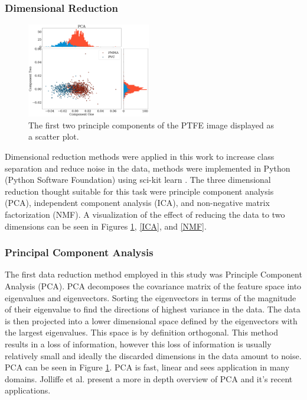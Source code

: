 \documentclass[a4paper,11pt]{article}
\begin{document}
\subsubsection{Dimensional Reduction}

\begin{figure}
  
  \begin{center}
    \includegraphics[width=0.48\textwidth]{figures/PCAnone.png}
  \end{center}
  
  \caption{The first two principle components of the PTFE image displayed as a scatter plot.}
  \label{PCA}
  
\end{figure}

Dimensional reduction methods were applied in this work to increase class separation and reduce noise in the data, methods were implemented in Python (Python Software Foundation) using sci-kit learn \cite{Pedregosa2011Scikit-learn:Python}. The three dimensional reduction thought suitable for this task were principle component analysis (PCA), independent component analysis (ICA), and non-negative matrix factorization (NMF). A visualization of the effect of reducing the data to two dimensions can be seen in Figures \ref{PCA}, \ref{ICA}, and \ref{NMF}.

\subsubsection{Principal Component Analysis}

The first data reduction method employed in this study was Principle Component Analysis (PCA). PCA decomposes the covariance matrix of the feature space into eigenvalues and eigenvectors. Sorting the eigenvectors in terms of the magnitude of their eigenvalue to find the directions of highest variance in the data. The data is then projected into a lower dimensional space defined by the eigenvectors with the largest eigenvalues. This space is by definition orthogonal. This method results in a loss of information, however this loss of information is usually relatively small and ideally the discarded dimensions in the data amount to noise. PCA can be seen in Figure \ref{PCA}. PCA is fast, linear and sees application in many domains. Jolliffe et al. \cite{Jolliffe2016PrincipalDevelopments.} present a more in depth overview of PCA and it's recent applications.
\end{document}
